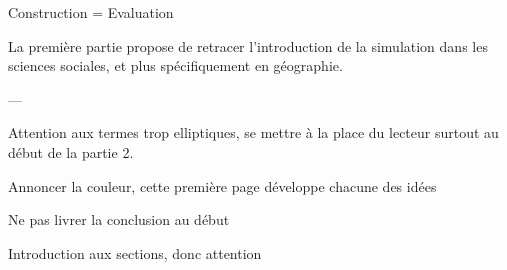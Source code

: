 Construction = Evaluation

La première partie propose de retracer l'introduction de la simulation dans les sciences sociales, et plus spécifiquement en géographie. 




---

Attention aux termes trop elliptiques, se mettre à la place du lecteur surtout au début de la partie 2.

Annoncer la couleur, cette première page développe chacune des idées 


Ne pas livrer la conclusion au début 

Introduction aux sections, donc attention 



\printbibliography[heading=subbibliography]

\stopcontents[chapters]
